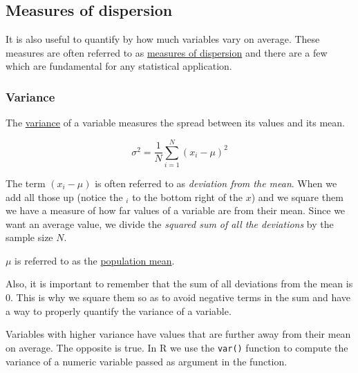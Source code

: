 \documentclass[
  letterpaper,
  DIV=11,
  numbers=noendperiod]{scrartcl}
\begin{document}
\subsection{Measures of dispersion}\label{measures-of-dispersion}

It is also useful to quantify by how much variables vary on average.
These measures are often referred to as
\href{https://www.geeksforgeeks.org/measures-of-dispersion/}{measures of
dispersion} and there are a few which are fundamental for any
statistical application.

\subsubsection{Variance}\label{variance}

The \href{https://www.investopedia.com/terms/v/variance.asp}{variance}
of a variable measures the spread between its values and its mean.

\[
\sigma^2 = \frac{1}{N} \sum_{i=1}^N (x_i - \mu)^2
\]

The term \((x_i - \mu)\) is often referred to as \emph{deviation from
the mean}. When we add all those up (notice the \(_i\) to the bottom
right of the \(x\)) and we square them we have a measure of how far
values of a variable are from their mean. Since we want an average
value, we divide the \emph{squared sum of all the deviations} by the
sample size \(N\).

\begin{tcolorbox}[enhanced jigsaw, bottomrule=.15mm, colframe=quarto-callout-note-color-frame, arc=.35mm, leftrule=.75mm, toptitle=1mm, toprule=.15mm, titlerule=0mm, breakable, opacityback=0, colbacktitle=quarto-callout-note-color!10!white, coltitle=black, bottomtitle=1mm, colback=white, title=\textcolor{quarto-callout-note-color}{\faInfo}\hspace{0.5em}{Note}, left=2mm, rightrule=.15mm, opacitybacktitle=0.6]

\(\mu\) is referred to as the
\href{https://www.wallstreetmojo.com/sample-mean-vs-population-mean/}{population
mean}.

Also, it is important to remember that the sum of all deviations from
the mean is 0. This is why we square them so as to avoid negative terms
in the sum and have a way to properly quantify the variance of a
variable.

\end{tcolorbox}

Variables with higher variance have values that are further away from
their mean on average. The opposite is true. In R we use the
\texttt{var()} function to compute the variance of a numeric variable
passed as argument in the function.
\end{document}
